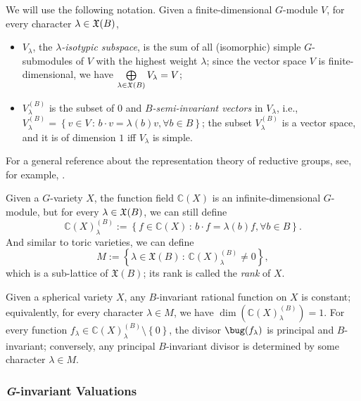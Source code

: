 \documentclass[11pt, oneside]{amsart}
\def\mid{\,:\,} %
\def\{{\mathopen{}\left\lbrace} \def\}{\right\rbrace\mathclose{}}
\newcommand{\<}{\left\langle} \renewcommand{\>}{\right\rangle}
\let\oldbigoplus\bigoplus
\renewcommand{\bigoplus}{\oldbigoplus\limits}
\renewcommand{\div}{\bug}
\begin{document}
We will use the following notation. Given a finite-dimensional $G$-module $V$, for every character $\lambda \in \mathfrak{X}(B)$,
\begin{itemize}
	\item $V_\lambda$, the \emph{$\lambda$-isotypic subspace}, is the sum of all (isomorphic) simple $G$-submodules of $V$ with the highest weight $\lambda$; since the vector space $V$ is finite-dimensional, we have $\bigoplus_{\lambda \in \ch(B)} V_\lambda = V$;

	\item $V_\lambda^{(B)}$ is the subset of $0$ and \emph{$B$-semi-invariant vectors} in $V_\lambda$, i.e., $V_\lambda^{(B)} = \{v \in V \mid b \cdot v = \lambda(b) v, \forall b \in B\}$; the subset $V_\lambda^{(B)}$ is a vector space, and it is of dimension $1$ iff $V_\lambda$ is simple.
\end{itemize}

For a general reference about the representation theory of reductive groups, see, for example, \cite{MT_Lin_alg_grp_fin_grp_Lie}. 

Given a $G$-variety $X$, the function field $\mathbb{C}(X)$ is an infinite-dimensional $G$-module, but for every $\lambda \in \mathfrak{X}(B)$, we can still define 
\begin{equation*}
	\mathbb{C}(X)_\lambda^{(B)} := \{f \in \mathbb{C}(X) \mid b \cdot f = \lambda(b) f, \forall b \in B\}.
\end{equation*}
And similar to toric varieties, we can define 
\begin{equation*}
	M := \{\lambda \in \mathfrak{X}(B) \mid \mathbb{C}(X)_\lambda^{(B)} \neq 0 \},
\end{equation*}
which is a sub-lattice of $\mathfrak{X}(B)$; its rank is called the \emph{rank} of $X$.

Given a spherical variety $X$, any $B$-invariant rational function on $X$ is constant; equivalently, for every character $\lambda \in M$, we have $\dim(\mathbb{C}(X)_\lambda^{(B)}) = 1$. For every function $f_\lambda \in \mathbb{C}(X)_\lambda^{(B)} \setminus \{0\}$, the divisor $\div(f_\lambda)$ is principal and $B$-invariant; conversely, any principal $B$-invariant divisor is determined by some character $\lambda \in M$.

\subsubsection{\textit{G}-invariant Valuations}\label{sec:prelim:sph:val}
\end{document}
